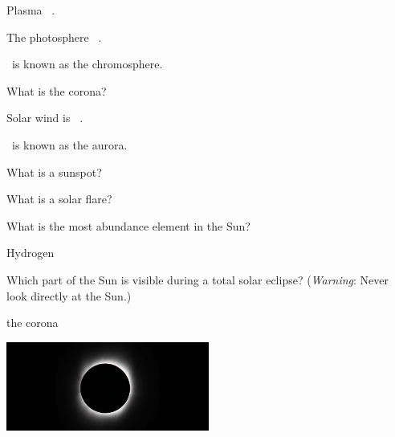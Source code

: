 \documentclass[addpoints]{exam}
\begin{document}
\begin{questions}


\question
Plasma \fillin\ .

\question
The photosphere \fillin\ .

\question
\fillin\ is known as the chromosphere.

\question
What is the corona?

\question
Solar wind is \fillin\ .

\question
\fillin\ is known as the aurora.

\question
What is a sunspot?

\question
What is a solar flare?

\question 
What is the most abundance element in the Sun?

\begin{choices}
\choice 
\correctchoice Hydrogen
\choice 
\choice 
\end{choices}

\question %
Which part of the Sun is visible during a total solar eclipse? (\textit{Warning}: Never look directly at the Sun.)
\vspace{1ex}

\begin{minipage}{0.3\textwidth}
    \centering
    \begin{choices}
    \choice 
    \choice 
    \correctchoice the corona 
    \choice 
    \end{choices}
\end{minipage}%
\begin{minipage}{0.5\textwidth}
    \centering
    \includegraphics[width=0.5\textwidth,trim={1.5in 0 1.8in 0},clip]{Figures/Figure4.23.jpg}
\end{minipage}
\vspace{1em}





\end{questions}
\end{document}
